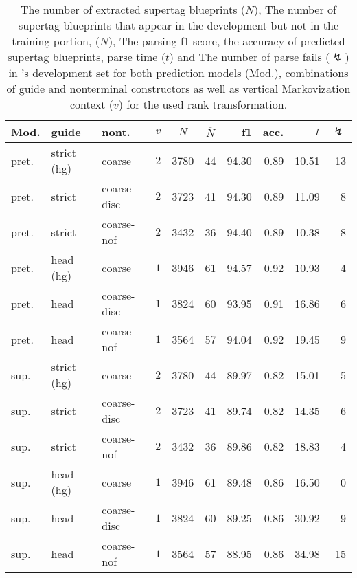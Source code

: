 \documentclass[../../document.tex]{subfiles}
\begin{document}
    \begin{table}
        \caption{\label{tbl:experiments:dptb:dcp}
        The number of extracted supertag blueprints ($N$), The number of supertag blueprints that appear in the development but not in the training portion, ($\overline{N}$), The parsing f1 score, the accuracy of predicted  supertag blueprints, parse time ($t$) and The number of parse fails ($\lightning$) in 's development set for both prediction models (Mod.), combinations of guide and nonterminal constructors as well as vertical Markovization context ($v$) for the used rank transformation.
        }
        \centering
        \setlength{\tabcolsep}{4pt}
        \vspace{.2cm}
        \begin{tabular}{lllc|cc|rrrr}
            \toprule
Mod. &  guide &   nont.   &\(v\)   & $N$ & $\overline{N}$ & f1 & acc. & $t$ & $\lightning$ \\ \hline \rowcolor{black!10}
pret. & strict (hg) &  coarse       & \(2\) & 3780 & 44 & 94.30 & 0.89 & 10.51 & 13  \\\hline
pret. & strict      &  coarse-disc  & \(2\) & 3723 & 41  & 94.30 & 0.89 & 11.09 & 8  \\
pret. & strict      &  coarse-nof   & \(2\) & 3432 & 36 & 94.40 & 0.89 & 10.38 & 8  \\ \hline\rowcolor{black!10}
pret. & head  (hg)  &  coarse       & \(1\) & 3946 & 61 & 94.57 & 0.92 & 10.93 & 4  \\\hline
pret. & head        &  coarse-disc  & \(1\) & 3824 & 60 & 93.95 & 0.91 & 16.86 & 6  \\
pret. & head        &  coarse-nof   & \(1\) & 3564 & 57 & 94.04 & 0.92 & 19.45 & 9  \\
\midrule \rowcolor{black!10}
sup. & strict (hg) &  coarse        & \(2\) & 3780 & 44 & 89.97 & 0.82 & 15.01 & 5  \\\hline
sup. & strict    &  coarse-disc     & \(2\) & 3723 & 41 & 89.74 & 0.82 & 14.35 & 6  \\
sup. & strict     &  coarse-nof     & \(2\) & 3432 & 36 & 89.86 & 0.82 & 18.83 & 4  \\\hline\rowcolor{black!10}
sup. & head (hg)  &  coarse         & \(1\) & 3946 & 61 & 89.48 & 0.86 & 16.50 & 0  \\\hline
sup. & head      &  coarse-disc     & \(1\) & 3824 & 60 & 89.25 & 0.86 & 30.92 & 9  \\
sup. & head       &  coarse-nof     & \(1\) & 3564 & 57 & 88.95 & 0.86 & 34.98 & 15  \\
    \bottomrule
        \end{tabular}
    \end{table}
\end{document}
